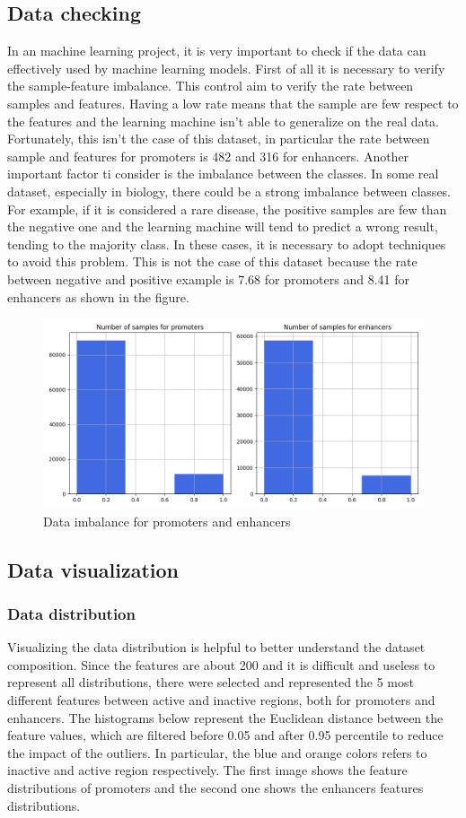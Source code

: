 \subsection{Data checking}

In an machine learning project, it is very important to check if the
data can effectively used by machine learning models. First of all it is
necessary to verify the sample-feature imbalance. This control aim to
verify the rate between samples and features. Having a low rate means
that the sample are few respect to the features and the learning machine
isn't able to generalize on the real data. Fortunately, this isn't the
case of this dataset, in particular the rate between sample and features
for promoters is 482 and 316 for enhancers. Another important factor ti
consider is the imbalance between the classes. In some real dataset,
especially in biology, there could be a strong imbalance between
classes. For example, if it is considered a rare disease, the positive
samples are few than the negative one and the learning machine will tend
to predict a wrong result, tending to the majority class. In these
cases, it is necessary to adopt techniques to avoid this problem. This
is not the case of this dataset because the rate between negative and
positive example is 7.68 for promoters and 8.41 for enhancers as shown
in the figure.

\begin{figure}[h!]
\centering
\includegraphics[width=0.7\linewidth]{../images/plot_class_imbalance.png}
\caption{Data imbalance for promoters and enhancers}
\end{figure}

\subsection{Data visualization}

\subsubsection{Data distribution}
Visualizing the data distribution is helpful to better understand the
dataset composition. Since the features are about 200 and it is
difficult and useless to represent all distributions, there were
selected and represented the 5 most different features between active
and inactive regions, both for promoters and enhancers. The histograms
below represent the Euclidean distance between the feature values, which
are filtered before 0.05 and after 0.95 percentile to reduce the impact
of the outliers. In particular, the blue and orange colors refers to
inactive and active region respectively. The first image shows the
feature distributions of promoters and the second one shows the
enhancers features distributions.

